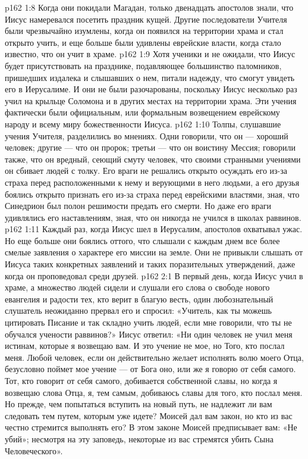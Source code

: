 \vs p162 1:8 Когда они покидали Магадан, только двенадцать апостолов знали, что Иисус намеревался посетить праздник кущей. Другие последователи Учителя были чрезвычайно изумлены, когда он появился на территории храма и стал открыто учить, и еще больше были удивлены еврейские власти, когда стало известно, что он учит в храме.
\vs p162 1:9 Хотя ученики и не ожидали, что Иисус будет присутствовать на празднике, подавляющее большинство паломников, пришедших издалека и слышавших о нем, питали надежду, что смогут увидеть его в Иерусалиме. И они не были разочарованы, поскольку Иисус несколько раз учил на крыльце Соломона и в других местах на территории храма. Эти учения фактически были официальным, или формальным возвещением еврейскому народу и всему миру божественности Иисуса.
\vs p162 1:10 Толпы, слушавшие учения Учителя, разделились во мнениях. Одни говорили, что он --- хороший человек; другие --- что он пророк; третьи --- что он воистину Мессия; говорили также, что он вредный, сеющий смуту человек, что своими странными учениями он сбивает людей с толку. Его враги не решались открыто осуждать его из\hyp{}за страха перед расположенными к нему и верующими в него людьми, а его друзья боялись открыто признать его из\hyp{}за страха перед еврейскими властями, зная, что Синедрион был полон решимости предать его смерти. Но даже его враги удивлялись его наставлениям, зная, что он никогда не учился в школах раввинов.
\vs p162 1:11 Каждый раз, когда Иисус шел в Иерусалим, апостолов охватывал ужас. Но еще больше они боялись оттого, что слышали с каждым днем все более смелые заявления о характере его миссии на земле. Они не привыкли слышать от Иисуса таких конкретных заявлений и таких поразительных утверждений, даже когда он проповедовал среди друзей.
\vs p162 2:1 В первый день, когда Иисус учил в храме, а множество людей сидели и слушали его слова о свободе нового евангелия и радости тех, кто верит в благую весть, один любознательный слушатель неожиданно прервал его и спросил: «Учитель, как ты можешь цитировать Писание и так складно учить людей, если мне говорили, что ты не обучался учености раввинов?» Иисус ответил: «Ни один человек не учил меня истинам, которые я возвещаю вам. И это учение не мое, но Того, кто послал меня. Любой человек, если он действительно желает исполнять волю моего Отца, безусловно поймет мое учение --- от Бога оно, или же я говорю от себя самого. Тот, кто говорит от себя самого, добивается собственной славы, но когда я возвещаю слова Отца, я, тем самым, добиваюсь славы для того, кто послал меня. Но прежде, чем попытаться вступить на новый путь, не надлежит ли вам следовать тем путем, которым уже идете? Моисей дал вам закон, но кто из вас честно стремится выполнять его? В этом законе Моисей предписывает вам: «Не убий»; несмотря на эту заповедь, некоторые из вас стремятся убить Сына Человеческого».
